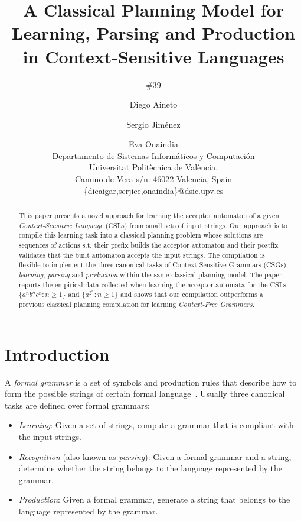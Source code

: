 \documentclass[letterpaper]{article} %
\begin{document}
\title{A Classical Planning Model for Learning, Parsing and Production in Context-Sensitive Languages}
\author{\#39}


\author{Diego Aineto\and Sergio Jim\'enez\and Eva Onaindia\\
{\small Departamento de Sistemas Inform\'aticos y Computaci\'on}\\
{\small Universitat Polit\`ecnica de Val\`encia.}\\
{\small Camino de Vera s/n. 46022 Valencia, Spain}\\
{\small \{dieaigar,serjice,onaindia\}@dsic.upv.es}}

\maketitle
\begin{abstract} 
This paper presents a novel approach for learning the acceptor automaton of a given {\em Context-Sensitive Language} (CSLs) from small sets of input strings. Our approach is to compile this learning task into a classical planning problem whose solutions are sequences of actions s.t. their prefix builds the acceptor automaton and their postfix validates that the built automaton accepts the input strings. The compilation is flexible to implement the three canonical tasks of Context-Sensitive Grammars (CSGs), {\it learning}, {\it parsing} and {\it production} within the same classical planning model. The paper reports the empirical data collected when learning the acceptor automata for the CSLs $\{a^nb^nc^n : n \geq 1 \}$ and $\{a^{2^n} : n \geq 1 \}$ and shows that our compilation outperforms a previous classical planning compilation for  learning {\em Context-Free Grammars}.
\end{abstract}


\section{Introduction}
\label{sec:section1}
A {\em formal grammar} is a set of symbols and production rules that describe how to form the possible strings of certain formal language~\cite{hopcroft:automatatheory:2001}. Usually three canonical tasks are defined over formal grammars:
\begin{itemize}
\item {\it Learning}: Given a set of strings, compute a grammar that is compliant with the input strings.
\item {\it Recognition} (also known as {\em parsing}): Given a formal grammar and a string, determine whether the string belongs to the language represented by the grammar.
\item {\it Production}: Given a formal grammar, generate a string that belongs to the language represented by the grammar.
\end{itemize}
\end{document}
